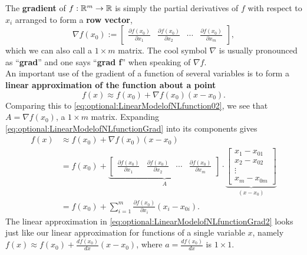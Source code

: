 \begin{tcolorbox}[title=\textbf{The Gradient and Linear Approximations}]
The \textbf{gradient} of $f:\mathbb R^m \to \mathbb R$ is simply the partial derivatives of $f$ with respect to $x_i$ arranged to form a \textbf{row vector},
\begin{equation}
    \label{eq:optional:GradientDef}
    \nabla f(x_0):=\left[\begin{array}{cccc}
        \frac{\partial f(x_0)}{\partial x_1} &  \frac{\partial f(x_0)}{\partial x_2} & \cdots &  \frac{\partial f(x_0)}{\partial x_m} 
    \end{array} \right],
\end{equation}
which we can also call a $1 \times m$ matrix. The cool symbol $\nabla$ is usually pronounced as ``\textbf{grad}'' and one says ``\textbf{grad f}'' when speaking of $\nabla f$. \\

An important use of the gradient of a function of several variables is to form a \textbf{linear approximation of the function about a point}
\begin{equation}
    \label{eq:optional:LinearModelofNLfunctionGrad}
      f(x) \approx f(x_0) + \nabla f(x_0) (x-x_0).
\end{equation}
Comparing this to \eqref{eq:optional:LinearModelofNLfunction02}, we see that
$A= \nabla f(x_0)$,
a $1 \times m$ matrix. Expanding \eqref{eq:optional:LinearModelofNLfunctionGrad} into its components gives
\begin{equation}
    \label{eq:optional:LinearModelofNLfunctionGrad2}
    \begin{aligned}
      f(x) &\approx f(x_0) + \nabla f(x_0) (x-x_0)\\
      &=f(x_0) + \underbrace{\left[\begin{array}{cccc}
        \frac{\partial f(x_0)}{\partial x_1} &  \frac{\partial f(x_0)}{\partial x_2} & \cdots &  \frac{\partial f(x_0)}{\partial x_m} 
    \end{array} \right]}_{A} \cdot \underbrace{\left[\begin{array}{c}
        x_1-x_{01} \\
        x_2-x_{02} \\
        \vdots \\
        x_m-x_{0m}
    \end{array} \right]}_{(x-x_0)} \\
     &= f(x_0) + \sum_{i=1}^m  \frac{\partial f(x_0)}{\partial x_i} (x_i-x_{0i}).
      \end{aligned}
\end{equation}
The linear approximation in \eqref{eq:optional:LinearModelofNLfunctionGrad2} looks just like our linear approximation for functions of a single variable $x$, namely $f(x) \approx f(x_0) + \frac{df(x_0)}{ dx} (x-x_0)$, where $a= \frac{df(x_0)}{ dx}$ is $1 \times 1.$

\end{tcolorbox}

